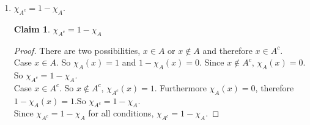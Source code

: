 \documentclass[11pt]{letter}
\newtheorem{claim}{Claim}
\theoremstyle{definition}
\begin{document}
\begin{enumerate}
\begin{enumerate}
          \begin{proof}
            There are three possibilities, $x\in A$, $x\in B$ and $x\notin A\cup B$.
            Case $x\in A$: So $x\in \chi_{A\cup B}$. So $max\{\chi_{A},\chi_{B}=1$ (Since $\chi$ has a max value of 1 and $\chi_A=1$). Therefore $\chi_{A\cup B}=\max\{\chi_A,\chi_B\}$.
            Case $x\in B$: So $x\in \chi_{A\cup B}$. So $max\{\chi_{A},\chi_{B}\}=1$ (Since $\chi$ has a max value of 1 and $\chi_B=1$). Therefore $\chi_{A\cup B}=\max\{\chi_A,\chi_B\}$.\\
            Case $x\notin A\cup B$: So $\chi_{A\cup B}(x)=0$. So $max\{\chi_A,\chi_B\}(x)=0$ (Since both $\chi_A(x)$ and $\chi_B(x)=0$). Therefore $\chi_{A\cup B}(x)=\max\{\chi_A(x),\chi_B(x)\}$.\\
            Since $\chi_{A\cup B}(x)=\max\{\chi_A(x),\chi_B(x)\}$ for all conditions, $\chi_{A\cup B}(x)=\max\{\chi_A(x),\chi_B(x)\}$.
          \end{proof}
	\item  $\chi_{A^c}=1-\chi_{A}$.
          \begin{claim}
            $\chi_{A^c}=1-\chi_{A}$
          \end{claim}
          \begin{proof}
            There are two possibilities, $x\in A$ or $x\notin A$ and therefore $x\in A^c$.\\
            Case $x\in A$. So $\chi_A(x)=1$ and $1-\chi_A(x)=0$. Since $x\notin A^c$, $\chi_A(x)=0$. So $\chi_{A^c}=1-\chi_{A}$.\\
            Case $x\in A^c$.  So $x\notin A^c$, $\chi_{A^c}(x)=1$. Furthermore $\chi_{A}(x)=0$, therefore $1-\chi_A(x)=1$.So $\chi_{A^c}=1-\chi_{A}$.\\
            Since $\chi_{A^c}=1-\chi_{A}$ for all conditions, $\chi_{A^c}=1-\chi_{A}$.
          \end{proof}
          

\end{enumerate}
\end{enumerate}
\end{document}
